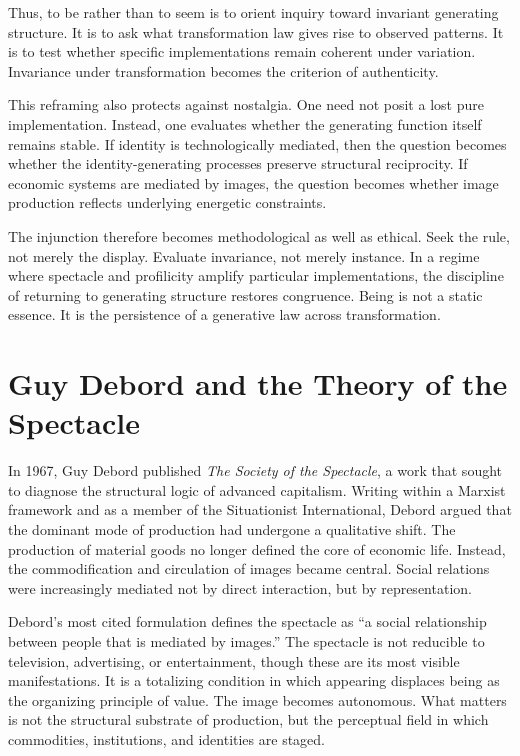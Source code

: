 \documentclass[11pt]{article}
\begin{document}
Thus, to be rather than to seem is to orient inquiry toward invariant generating structure. It is to ask what transformation law gives rise to observed patterns. It is to test whether specific implementations remain coherent under variation. Invariance under transformation becomes the criterion of authenticity.

This reframing also protects against nostalgia. One need not posit a lost pure implementation. Instead, one evaluates whether the generating function itself remains stable. If identity is technologically mediated, then the question becomes whether the identity-generating processes preserve structural reciprocity. If economic systems are mediated by images, the question becomes whether image production reflects underlying energetic constraints.

The injunction therefore becomes methodological as well as ethical. Seek the rule, not merely the display. Evaluate invariance, not merely instance. In a regime where spectacle and profilicity amplify particular implementations, the discipline of returning to generating structure restores congruence. Being is not a static essence. It is the persistence of a generative law across transformation.

\section{Guy Debord and the Theory of the Spectacle}

In 1967, Guy Debord published \textit{The Society of the Spectacle}, a work that sought to diagnose the structural logic of advanced capitalism. Writing within a Marxist framework and as a member of the Situationist International, Debord argued that the dominant mode of production had undergone a qualitative shift. The production of material goods no longer defined the core of economic life. Instead, the commodification and circulation of images became central. Social relations were increasingly mediated not by direct interaction, but by representation.

Debord’s most cited formulation defines the spectacle as ``a social relationship between people that is mediated by images.'' The spectacle is not reducible to television, advertising, or entertainment, though these are its most visible manifestations. It is a totalizing condition in which appearing displaces being as the organizing principle of value. The image becomes autonomous. What matters is not the structural substrate of production, but the perceptual field in which commodities, institutions, and identities are staged.
\end{document}
